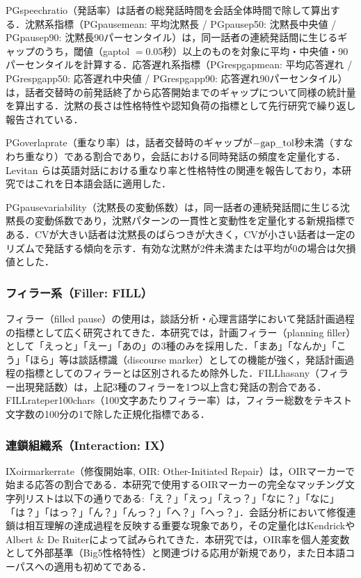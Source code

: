 \documentclass[dvipdfmx,11pt,a4paper]{bxjsarticle}
\renewcommand{\_}{\paperorigunderscore\allowbreak}%
\begin{document}
PG\_speech\_ratio（発話率）は話者の総発話時間を会話全体時間で除して算出する．沈黙系指標（PG\_pause\_mean: 平均沈黙長 / PG\_pause\_p50: 沈黙長中央値 / PG\_pause\_p90: 沈黙長90パーセンタイル）は，同一話者の連続発話間に生じるギャップのうち，閾値（gap\_tol $= 0.05$秒）以上のものを対象に平均・中央値・90パーセンタイルを計算する．応答遅れ系指標（PG\_resp\_gap\_mean: 平均応答遅れ / PG\_resp\_gap\_p50: 応答遅れ中央値 / PG\_resp\_gap\_p90: 応答遅れ90パーセンタイル）は，話者交替時の前発話終了から応答開始までのギャップについて同様の統計量を算出する．沈黙の長さは性格特性や認知負荷の指標として先行研究で繰り返し報告されている\cite{campione2002}．

PG\_overlap\_rate（重なり率）は，話者交替時のギャップが$-\text{gap\_tol}$秒未満（すなわち重なり）である割合であり，会話における同時発話の頻度を定量化する．Levitan ら\cite{levitan2012}は英語対話における重なり率と性格特性の関連を報告しており，本研究ではこれを日本語会話に適用した．

PG\_pause\_variability（沈黙長の変動係数）は，同一話者の連続発話間に生じる沈黙長の変動係数であり，沈黙パターンの一貫性と変動性を定量化する新規指標である．CVが大きい話者は沈黙長のばらつきが大きく，CVが小さい話者は一定のリズムで発話する傾向を示す．有効な沈黙が2件未満または平均が0の場合は欠損値とした．

\subsubsection{フィラー系（Filler: FILL）}
フィラー（filled pause）の使用は，談話分析・心理言語学において発話計画過程の指標として広く研究されてきた\cite{clark1996,watanabe2003}．本研究では，計画フィラー（planning filler）として「えっと」「えー」「あの」の3種のみを採用した．「まあ」「なんか」「こう」「ほら」等は談話標識（discourse marker）としての機能が強く，発話計画過程の指標としてのフィラーとは区別されるため除外した\cite{watanabe2003}．FILL\_has\_any（フィラー出現発話数）は，上記3種のフィラーを1つ以上含む発話の割合である．FILL\_rate\_per\_100chars（100文字あたりフィラー率）は，フィラー総数をテキスト文字数の100分の1で除した正規化指標である．

\subsubsection{連鎖組織系（Interaction: IX）}
IX\_oirmarker\_rate（修復開始率, OIR: Other-Initiated Repair）は，OIRマーカーで始まる応答の割合である．本研究で使用するOIRマーカーの完全なマッチング文字列リストは以下の通りである:「え？」「えっ」「えっ？」「なに？」「なに」「は？」「はっ？」「ん？」「んっ？」「へ？」「へっ？」．会話分析において修復連鎖は相互理解の達成過程を反映する重要な現象であり\cite{schegloff1977}，その定量化はKendrick\cite{kendrick2015}やAlbert \& De Ruiter\cite{albert2018}によって試みられてきた．本研究では，OIR率を個人差変数として外部基準（Big5性格特性）と関連づける応用が新規であり，また日本語コーパスへの適用も初めてである．
\end{document}
